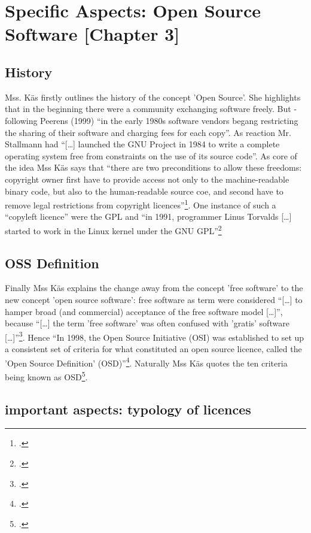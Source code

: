 \documentclass[DIV=calc,BCOR=5mm,11pt,headings=small,oneside,abstract=true, toc=bib]{scrartcl}
\begin{document}
\section{Specific Aspects: Open Source Software [Chapter 3]}

\subsection{History}
Mss. Käs firstly outlines the history of the concept 'Open Source'. She
highlights that in the beginning there were a community exchanging software
freely. But - following Peerens (1999) \enquote{in the early 1980s software
vendors begang restricting the sharing of their software and charging
fees for each copy}. As reaction Mr. Stallmann had \enquote{[\ldots]
launched the GNU Project in 1984 to write a complete operating system
free from constraints on the use of its source code}. As core of the idea
Mss Käs says that \enquote{there are two preconditions to allow these
freedoms: copyright owner first have to provide access not only to the
machine-readable binary code, but also to the human-readable source coe,
and second have to remove legal restrictions from copyright
licences}\footcite[cf.][59]{Kaes2008a}. One instance of such a
\enquote{copyleft licence} were the GPL and \enquote{in 1991,
programmer Linus Torvalds [\ldots] started to work in the Linux kernel
under the GNU GPL}\footcite[cf.][60]{Kaes2008a}

\subsection{OSS Definition}
Finally Mss Käs explains the change away from the concept 'free software' to the
new concept 'open source software': free software as term were considered
\enquote{[\ldots] to hamper broad (and commercial) acceptance of the free
software model [\ldots]}, because \enquote{[\ldots]
the term 'free software' was often confused
with 'gratis' software [\ldots]}\footcite[cf.][60]{Kaes2008a}. Hence
\enquote{In 1998, the Open Source Initiative (OSI) was established to set
up a consistent set of criteria for what constituted an open source
licence, called the 'Open Source Definition'
(OSD)}\footcite[cf.][60]{Kaes2008a}. Naturally Mss Käs quotes the ten
criteria being known as OSD\footcite[cf.][62]{Kaes2008a}.

\subsection{important aspects: typology of licences}
\end{document}
